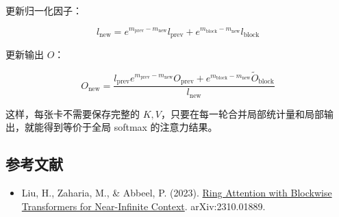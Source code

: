 更新归一化因子：

\[
l_{\mathrm{new}} =
e^{m_{\mathrm{prev}} - m_{\mathrm{new}}} l_{\mathrm{prev}}
+ e^{m_{\mathrm{block}} - m_{\mathrm{new}}} l_{\mathrm{block}}
\]

更新输出 \(O\)：

\[
O_{\mathrm{new}} =
\frac{
l_{\mathrm{prev}} e^{m_{\mathrm{prev}} - m_{\mathrm{new}}} O_{\mathrm{prev}}
+ e^{m_{\mathrm{block}} - m_{\mathrm{new}}} \tilde O_{\mathrm{block}}
}{
l_{\mathrm{new}}
}
\]

这样，每张卡不需要保存完整的 \(K, V\)，只要在每一轮合并局部统计量和局部输出，就能得到等价于全局 softmax 的注意力结果。

\FloatBarrier
{}
\hypertarget{ux53c2ux8003ux6587ux732e-93}{%
\subsection{参考文献}\label{ux53c2ux8003ux6587ux732e-93}}

\vspace{0.25em}
\begin{itemize}
\tightlist
\item
  Liu, H., Zaharia, M., \& Abbeel, P. (2023). \href{https://arxiv.org/abs/2310.01889}{Ring Attention with Blockwise Transformers for Near-Infinite Context}. arXiv:2310.01889.
\end{itemize}

\clearpage

